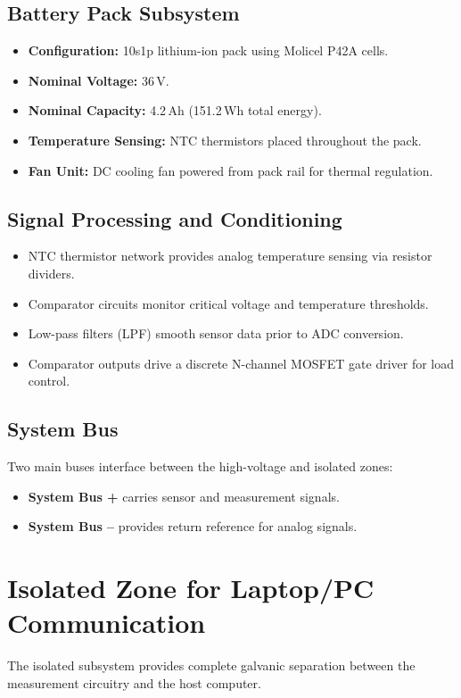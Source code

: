 \documentclass[12pt,a4paper]{article}
\begin{document}
\subsection{Battery Pack Subsystem}
\begin{itemize}
    \item \textbf{Configuration:} 10s1p lithium-ion pack using Molicel P42A cells.
    \item \textbf{Nominal Voltage:} 36\,V.
    \item \textbf{Nominal Capacity:} 4.2\,Ah (151.2\,Wh total energy).
    \item \textbf{Temperature Sensing:} NTC thermistors placed throughout the pack.
    \item \textbf{Fan Unit:} DC cooling fan powered from pack rail for thermal regulation.
\end{itemize}

\subsection{Signal Processing and Conditioning}
\begin{itemize}
    \item NTC thermistor network provides analog temperature sensing via resistor dividers.
    \item Comparator circuits monitor critical voltage and temperature thresholds.
    \item Low-pass filters (LPF) smooth sensor data prior to ADC conversion.
    \item Comparator outputs drive a discrete N-channel MOSFET gate driver for load control.
\end{itemize}

\subsection{System Bus}
Two main buses interface between the high-voltage and isolated zones:
\begin{itemize}
    \item \textbf{System Bus +} carries sensor and measurement signals.
    \item \textbf{System Bus –} provides return reference for analog signals.
\end{itemize}

\section{Isolated Zone for Laptop/PC Communication}
The isolated subsystem provides complete galvanic separation between the measurement circuitry and the host computer.
\end{document}
